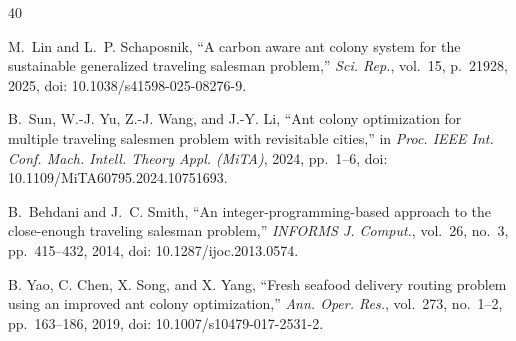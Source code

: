 \begin{thebibliography}{40}

M.~Lin and L.~P. Schaposnik, ``A carbon aware ant colony system for the sustainable generalized traveling salesman problem,'' \textit{Sci. Rep.}, vol.~15, p.~21928, 2025, doi: 10.1038/s41598-025-08276-9.



B.~Sun, W.-J. Yu, Z.-J. Wang, and J.-Y. Li, ``Ant colony optimization for multiple traveling salesmen problem with revisitable cities,'' in \textit{Proc. IEEE Int. Conf. Mach. Intell. Theory Appl. (MiTA)}, 2024, pp.~1--6, doi: 10.1109/MiTA60795.2024.10751693.



B.~Behdani and J.~C. Smith, ``An integer-programming-based approach to the close-enough traveling salesman problem,'' \textit{INFORMS J. Comput.}, vol.~26, no.~3, pp.~415--432, 2014, doi: 10.1287/ijoc.2013.0574.



B. Yao, C. Chen, X. Song, and X. Yang, ``Fresh seafood delivery routing problem using an improved ant colony optimization,'' \textit{Ann. Oper. Res.}, vol.~273, no.~1--2, pp.~163--186, 2019, doi: 10.1007/s10479-017-2531-2.

\end{thebibliography}


